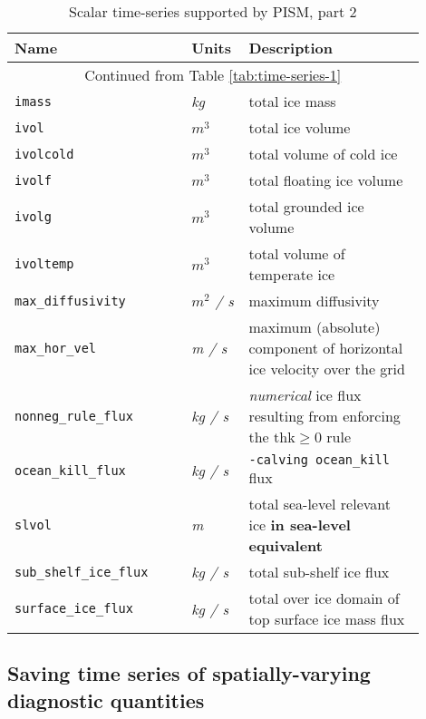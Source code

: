 \begin{table}[ht]
  \centering
 \begin{tabular}{p{0.4\linewidth}p{0.1\linewidth}p{0.4\linewidth}}
    \toprule
    \textbf{Name} & \textbf{Units} & \textbf{Description}\\
    \midrule
    \multicolumn{3}{c}{Continued from Table \ref{tab:time-series-1}}\\
    \texttt{imass} & \textsl{kg} &  total ice mass \\
    \texttt{ivol} & \textsl{$m^{3}$} &  total ice volume \\
    \texttt{ivolcold} & \textsl{$m^{3}$} &  total volume of cold ice \\
    \texttt{ivolf} & \textsl{$m^{3}$} &  total floating ice volume \\
    \texttt{ivolg} & \textsl{$m^{3}$} &  total grounded ice volume \\
    \texttt{ivoltemp} & \textsl{$m^{3}$} &  total volume of temperate ice \\
    \texttt{max_diffusivity} & \textsl{$m^{2}$  / s} &  maximum diffusivity \\
    \texttt{max_hor_vel} & \textsl{m  / s} &  maximum (absolute) component of horizontal ice velocity over the grid \\
    \texttt{nonneg_rule_flux} & \textsl{kg  / s} &  \emph{numerical} ice flux resulting from enforcing the $\mathrm{thk} \ge 0$ rule \\
    \texttt{ocean_kill_flux} & \textsl{kg  / s} &  \texttt{-calving ocean_kill} flux \\
    \texttt{slvol} & \textsl{m} &  total sea-level relevant ice \textbf{in sea-level equivalent} \\
    \texttt{sub_shelf_ice_flux} & \textsl{kg  / s} &  total sub-shelf ice flux \\
    \texttt{surface_ice_flux} & \textsl{kg  / s} &  total over ice domain of top surface ice mass flux \\
    \bottomrule
  \end{tabular}
\caption{Scalar time-series supported by PISM, part 2}
\label{tab:time-series-2}
\end{table}

\clearpage

\subsection{Saving time series of spatially-varying diagnostic quantities}
\label{sec:saving-spat-vari}


